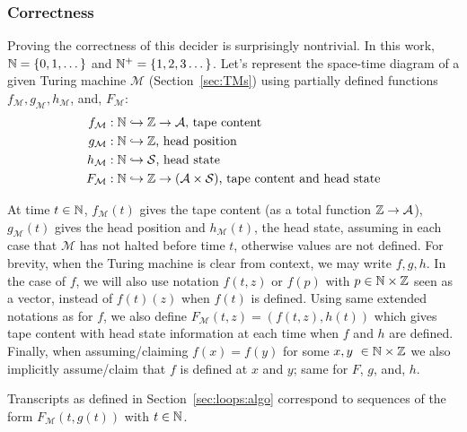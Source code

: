 \subsubsection{Correctness}
Proving the correctness of this decider is surprisingly nontrivial. In this work, $\mathbb{N} = \{0,1,\dots\}$ and $\mathbb{N}^+ = \{1,2,3\dots\}$. Let's represent the space-time diagram of a given Turing machine $\mathcal{M}$ (Section~\ref{sec:TMs}) using partially defined functions $f_\mathcal{M},g_\mathcal{M},h_\mathcal{M}$, and, $F_\mathcal{M}$:
\begin{align*}
    f_\mathcal{M} & : \mathbb{N} \hookrightarrow \mathbb{Z} \to \mathcal{A}\text{, tape content}                                \\
    g_\mathcal{M} & : \mathbb{N} \hookrightarrow \mathbb{Z}\text{, head position}                                             \\
    h_\mathcal{M} & : \mathbb{N} \hookrightarrow \mathcal{S}\text{, head state}                                           \\
    F_\mathcal{M} & : \mathbb{N} \hookrightarrow \mathbb{Z} \to (\mathcal{A}\times \mathcal{S})\text{, tape content and head state}
\end{align*}

\newcommand{\baref}{F}

At time $t\in\mathbb{N}$, $f_\mathcal{M}(t)$ gives the tape content (as a total function $\mathbb{Z} \to \mathcal{A}$), $g_\mathcal{M}(t)$ gives the head position and $h_\mathcal{M}(t)$, the head state, assuming in each case that $\mathcal{M}$ has not halted before time $t$, otherwise values are not defined. For brevity, when the Turing machine is clear from context, we may write $f,g,h$. In the case of $f$, we will also use notation $f(t,z)$ or $f(p)$ with $p \in \mathbb{N} \times \mathbb{Z}$ seen as a vector, instead of $f(t)(z)$ when $f(t)$ is defined. Using same extended notations as for $f$, we also define $\baref_\mathcal{M}(t,z) = (f(t,z),h(t))$ which gives tape content with head state information at each time when $f$ and $h$ are defined.
Finally, when assuming/claiming $f(x) = f(y)$ for some $x,y \in \N \times \Z$ we also implicitly assume/claim that $f$ is defined at $x$ and $y$; same for $\baref$, $g$, and, $h$.

Transcripts as defined in Section~\ref{sec:loops:algo} correspond to sequences of the form $F_\mathcal{M}(t,g(t))$ with $t\in\mathbb{N}$.

